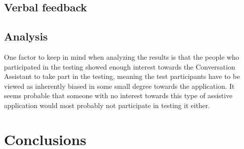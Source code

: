 \documentclass[english, 12pt, a4paper, pdftex, elec, utf8]{aaltothesis}
\begin{document}
\subsection{Verbal feedback}

\subsection{Analysis}  

One factor to keep in mind when analyzing the results is that the people who participated in the testing showed enough interest towards the Conversation Assistant to take part in the testing, meaning the test participants have to be viewed as inherently biased in some small degree towards the application. It seems probable that someone with no interest towards this type of assistive application would most probably not participate in testing it either.

\clearpage

\section{Conclusions} \label{sec:loppu}
\end{document}
